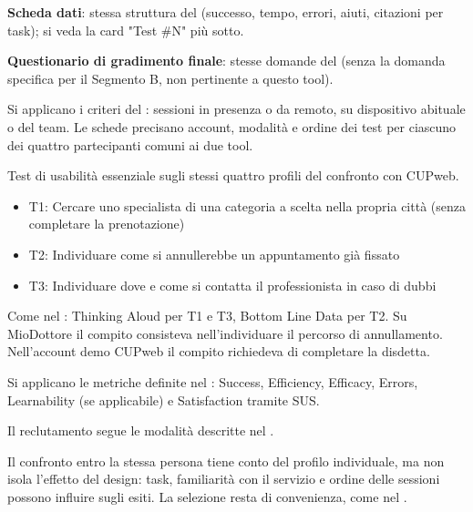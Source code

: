 \textbf{Scheda dati}: stessa struttura del  (successo,
tempo, errori, aiuti, citazioni per task); si veda la card "Test \#N"
più sotto.

\textbf{Questionario di gradimento finale}: stesse domande del
 (senza la domanda specifica per il Segmento B, non
pertinente a questo tool).


Si applicano i criteri del : sessioni in presenza o da remoto,
su dispositivo abituale o del team. Le schede precisano account, modalità
e ordine dei test per ciascuno dei quattro partecipanti comuni ai due tool.


Test di usabilità essenziale sugli stessi quattro profili del confronto
con CUPweb.


\begin{itemize}
\item
  T1: Cercare uno specialista di una categoria a scelta nella propria
  città (senza completare la prenotazione)
\item
  T2: Individuare come si annullerebbe un appuntamento già fissato
\item
  T3: Individuare dove e come si contatta il professionista in caso
  di dubbi
\end{itemize}


Come nel : Thinking Aloud per T1 e T3, Bottom Line Data per T2.
Su MioDottore il compito consisteva nell'individuare il percorso di
annullamento. Nell'account demo CUPweb il compito richiedeva di completare
la disdetta.


Si applicano le metriche definite nel : Success, Efficiency,
Efficacy, Errors, Learnability (se applicabile) e Satisfaction tramite SUS.


Il reclutamento segue le modalità descritte nel .


Il confronto entro la stessa persona tiene conto del profilo individuale,
ma non isola l'effetto del design: task, familiarità con il servizio e
ordine delle sessioni possono influire sugli esiti. La selezione resta di
convenienza, come nel .

